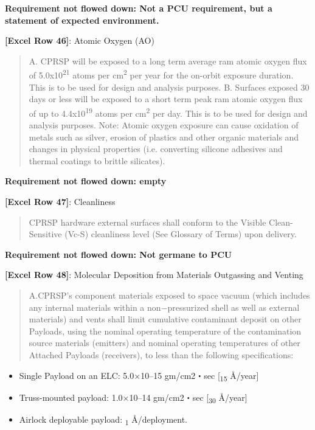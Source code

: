 \textbf{Requirement not flowed down: Not a PCU requirement, but a statement of expected environment.}

\textbf{[Excel Row 46]}: Atomic Oxygen (AO)

\begin{quote}
A. CPRSP will be exposed to a long term average ram atomic oxygen flux of 5.0x10\textsuperscript{21} atoms per cm\textsuperscript{2} per year for the on-orbit exposure duration. This is to be used for design and analysis purposes. B. Surfaces exposed 30 days or less will be exposed to a short term peak ram atomic oxygen flux of up to 4.4x10\textsuperscript{19} atoms per cm\textsuperscript{2} per day. This is to be used for design and analysis purposes. Note: Atomic oxygen exposure can cause oxidation of metals such as silver, erosion of plastics and other organic materials and changes in physical properties (i.e. converting silicone adhesives and thermal coatings to brittle silicates).
\end{quote}

\textbf{Requirement not flowed down: empty}

\textbf{[Excel Row 47]}: Cleanliness

\begin{quote}
CPRSP hardware external surfaces shall conform to the Visible Clean-Sensitive (Vc-S) cleanliness level (See Glossary of Terms) upon delivery.
\end{quote}

\textbf{Requirement not flowed down: Not germane to PCU}

\textbf{[Excel Row 48]}: Molecular Deposition from Materials Outgassing and Venting

\begin{quote}
A.CPRSP's component materials exposed to space vacuum (which includes any internal materials within a non−pressurized shell as well as external materials) and vents shall limit cumulative contaminant deposit on other Payloads, using the nominal operating temperature of the contamination source materials (emitters) and nominal operating temperatures of other Attached Payloads (receivers), to less than the following specifications:
\end{quote}

\begin{itemize}
\item{} Single Payload on an ELC: 5.0×10--15 gm\slash cm2・sec [\textsubscript{15} Å\slash year]

\item{} Truss-mounted payload: 1.0×10--14 gm\slash cm2・sec [\textsubscript{30} Å\slash year]

\item{} Airlock deployable payload: \textsubscript{1} Å\slash deployment.

\end{itemize}

